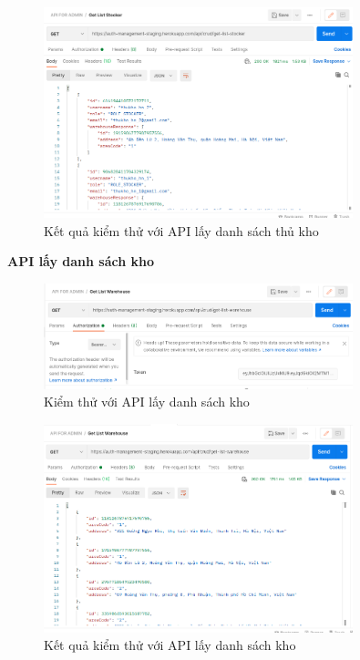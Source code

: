 		\begin{figure}[!ht]
			\includegraphics[width=0.8\textwidth]{Images/testing/API-get-list-stocker-result.png}
			\centering
			\linebreak
			\caption{Kết quả kiểm thử với API lấy danh sách thủ kho}
		\end{figure}
		
		\newpage
		
		\textbf{API lấy danh sách kho}
		
		\begin{figure}[!ht]
			\includegraphics[width=0.8\textwidth]{Images/testing/API-get-list-warehouse.png}
			\centering
			\linebreak
			\caption{Kiểm thử với API lấy danh sách kho}
		\end{figure}
		
		\begin{figure}[!ht]
			\includegraphics[width=0.8\textwidth]{Images/testing/API-get-list-warehouse-result.png}
			\centering
			\linebreak
			\caption{Kết quả kiểm thử với API lấy danh sách kho}
		\end{figure}
		
